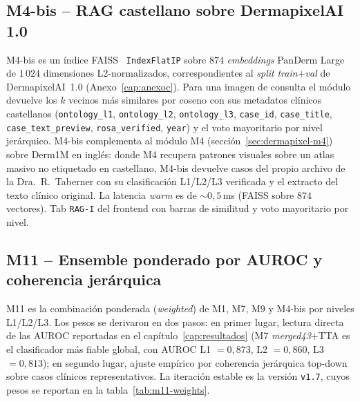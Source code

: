 \subsection{M4-bis -- RAG castellano sobre DermapixelAI 1.0}
\label{sec:dermapixel-m4bis}

M4-bis es un índice FAISS~\cite{faiss2019} \texttt{IndexFlatIP}
sobre $874$ \emph{embeddings} PanDerm Large de $1\,024$
dimensiones L2-normalizados, correspondientes al \emph{split}
\emph{train}$+$\emph{val} de DermapixelAI~1.0 (Anexo~\ref{cap:anexoc}).
Para una imagen de consulta el módulo devuelve los $k$ vecinos
más similares por coseno con sus metadatos clínicos castellanos
(\texttt{ontology\_l1}, \texttt{ontology\_l2}, \texttt{ontology\_l3},
\texttt{case\_id}, \texttt{case\_title}, \texttt{case\_text\_preview},
\texttt{rosa\_verified}, \texttt{year}) y el voto mayoritario por
nivel jerárquico. M4-bis complementa al módulo M4
(sección~\ref{sec:dermapixel-m4}) sobre Derm1M en inglés: donde
M4 recupera patrones visuales sobre un atlas masivo no etiquetado
en castellano, M4-bis devuelve casos del propio archivo de la
Dra.~R.~Taberner con su clasificación L1/L2/L3 verificada y el
extracto del texto clínico original. La latencia \emph{warm} es
de $\sim 0{,}5$\,ms (FAISS sobre $874$ vectores). Tab
\texttt{RAG-I} del frontend con barras de similitud y voto
mayoritario por nivel.

\subsection{M11 -- Ensemble ponderado por AUROC y coherencia
jerárquica}
\label{sec:dermapixel-m11sub}

M11 es la combinación ponderada (\emph{weighted}) de M1, M7, M9
y M4-bis por niveles L1/L2/L3. Los pesos se derivaron en dos
pasos: en primer lugar, lectura directa de las AUROC reportadas
en el capítulo~\ref{cap:resultados} (M7 \emph{merged43}+TTA es
el clasificador más fiable global, con AUROC L1 $= 0{,}873$,
L2 $= 0{,}860$, L3 $= 0{,}813$); en segundo lugar, ajuste empírico
por coherencia jerárquica top-down sobre casos clínicos
representativos. La iteración estable es la versión \texttt{v1.7},
cuyos pesos se reportan en la tabla~\ref{tab:m11-weights}.


